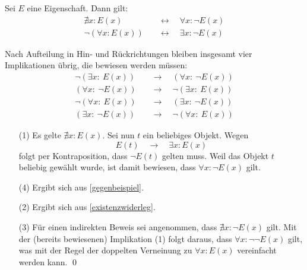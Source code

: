 \begin{satz} \label{quantorennegieren} 
    Sei $E$ eine Eigenschaft. Dann gilt:
    \begin{align*}
        \nexists x: E(x) \quad& \leftrightarrow\quad \forall x: \neg E(x) \\
        \neg (\forall x: E(x)) \quad& \leftrightarrow\quad \exists x: \neg E(x)
    \end{align*}
\end{satz}


\begin{bew}[(*)]
    Nach Aufteilung in Hin- und Rückrichtungen bleiben insgesamt vier Implikationen übrig, die bewiesen werden müssen:
    \begin{align}
        \neg (\exists x:\ E(x)) \quad& \to\quad (\forall x:\ \neg E(x)) \tag{1} \\
        (\forall x:\ \neg E(x)) \quad& \to\quad \neg (\exists x:\ E(x)) \tag{2} \\
        \neg (\forall x:\ E(x)) \quad& \to\quad (\exists x:\ \neg E(x)) \tag{3} \\
        (\exists x:\ \neg E(x)) \quad& \to\quad \neg (\forall x:\ E(x)) \tag{4}
    \end{align}
    \begin{enumerate}
        \item[(1)] Es gelte $\nexists x : E(x)$. Sei nun $t$ ein beliebiges Objekt. Wegen
            \[ E(t) \quad \to \quad \exists x: E(x) \]
        folgt per Kontraposition, dass $\neg E(t)$ gelten muss. Weil das Objekt $t$ beliebig gewählt wurde, ist damit bewiesen, dass $\forall x: \neg E(x)$ gilt.
        \item[(4)] Ergibt sich aus \cref{gegenbeispiel}.
        \item[(2)] Ergibt sich aus \cref{existenzwiderleg}.
        \item[(3)] Für einen indirekten Beweis sei angenommen, dass $\nexists x: \neg E(x)$ gilt. Mit der (bereits bewiesenen) Implikation (1) folgt daraus, dass $\forall x: \neg\neg E(x)$ gilt, was mit der Regel der doppelten Verneinung zu $\forall x: E(x)$ vereinfacht werden kann. \qed
    \end{enumerate}
\end{bew}


